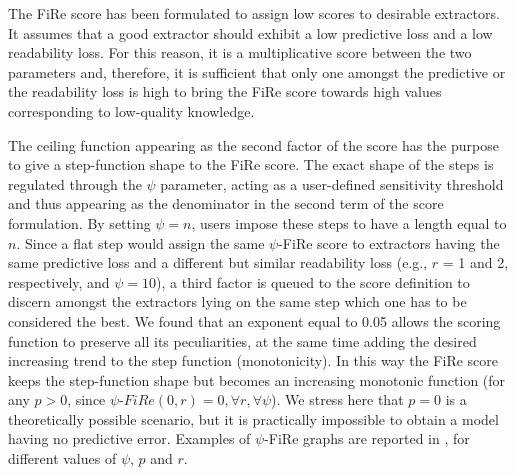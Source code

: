\documentclass{article}
\newcommand{\fire}{FiRe}
\newcommand{\psifire}{$\psi$-\fire}
\begin{document}
The \fire{} score has been formulated to assign low scores to desirable extractors.
%
It assumes that a good extractor should exhibit a low predictive loss and a low readability loss.
%
For this reason, it is a multiplicative score between the two parameters and, therefore, it is sufficient that only one amongst the predictive or the readability loss is high to bring the \fire{} score towards high values corresponding to low-quality knowledge.

The ceiling function appearing as the second factor of the score has the purpose to give a step-function shape to the \fire{} score.
%
The exact shape of the steps is regulated through the $\psi$ parameter, acting as a user-defined sensitivity threshold and thus appearing as the denominator in the second term of the score formulation.
%
By setting $\psi=n$, users impose these steps to have a length equal to $n$.
%
Since a flat step would assign the same \psifire{} score to extractors having the same predictive loss and a different but similar readability loss (e.g., $r$ = 1 and 2, respectively, and $\psi=10$), a third factor is queued to the score definition to discern amongst the extractors lying on the same step which one has to be considered the best.
%
We found that an exponent equal to 0.05 allows the scoring function to preserve all its peculiarities, at the same time adding the desired increasing trend to the step function (monotonicity).
%
In this way the \fire{} score keeps the step-function shape but becomes an increasing monotonic function (for any $p>0$, since $\psi\textrm{-}\fire{}(0, r)=0, \forall r, \forall \psi$).
%
We stress here that $p=0$ is a theoretically possible scenario, but it is practically impossible to obtain a model having no predictive error.
%
Examples of \psifire{} graphs are reported in , for different values of $\psi$, $p$ and $r$.

\end{document}
